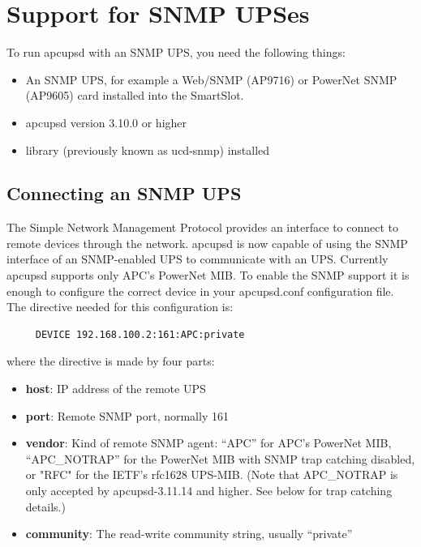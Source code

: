 {{{{{{{{{\label{Support-for-SNMP-UPSes}

\section*{Support for SNMP UPSes}

\label{index-SNMP-162}
To run apcupsd with an SNMP UPS, you need the following things:  

\begin{itemize}
\item An SNMP UPS, for example a Web/SNMP (AP9716) or PowerNet SNMP (AP9605)
card installed into the SmartSlot.  
\item apcupsd version 3.10.0 or higher  
\item 
    library (previously known as
   ucd-snmp) installed 
\end{itemize}

\label{Connecting-an-SNMP-UPS}

\subsection*{Connecting an SNMP UPS}

\label{index-SNMP_002c-Connecting-163}
The Simple Network Management Protocol provides an interface to connect to
remote devices through the network. apcupsd is now capable of using the SNMP
interface of an SNMP-enabled UPS to communicate with an UPS. Currently apcupsd
supports only APC's PowerNet MIB. To enable the SNMP support it is enough to
configure the correct device in your apcupsd.conf configuration file. The
directive needed for this configuration is: 

\footnotesize
\begin{verbatim}
     DEVICE 192.168.100.2:161:APC:private
\end{verbatim}
\normalsize

where the directive is made by four parts:  

\begin{itemize}
\item {\bf host}: IP address of the remote UPS  
\item {\bf port}: Remote SNMP port, normally 161
\item {\bf vendor}: Kind of remote SNMP agent: ``APC'' for APC's PowerNet MIB, 
``APC\_NOTRAP'' for the PowerNet MIB with SNMP trap catching disabled, or "RFC"
for the IETF's rfc1628 UPS-MIB. (Note that APC\_NOTRAP is only accepted by 
apcupsd-3.11.14 and higher. See below for trap catching details.)
\item {\bf community}: The read-write community string, usually ``private''
\end{itemize}

}}}}}}}}}
